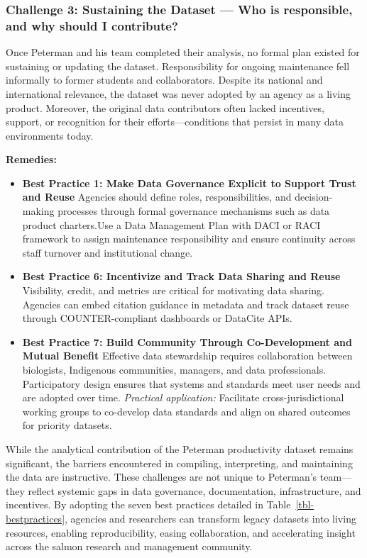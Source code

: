 \documentclass[
  letterpaper,
  DIV=11,
  numbers=noendperiod]{scrartcl}
\begin{document}
\subsubsection{Challenge 3: Sustaining the Dataset --- Who is
responsible, and why should I
contribute?}\label{challenge-3-sustaining-the-dataset-who-is-responsible-and-why-should-i-contribute}

Once Peterman and his team completed their analysis, no formal plan
existed for sustaining or updating the dataset. Responsibility for
ongoing maintenance fell informally to former students and
collaborators. Despite its national and international relevance, the
dataset was never adopted by an agency as a living product. Moreover,
the original data contributors often lacked incentives, support, or
recognition for their efforts---conditions that persist in many data
environments today.

\textbf{Remedies:}

\begin{itemize}
\item
  \textbf{Best Practice 1: Make Data Governance Explicit to Support
  Trust and Reuse} Agencies should define roles, responsibilities, and
  decision-making processes through formal governance mechanisms such as
  data product charters.Use a Data Management Plan with DACI or RACI
  framework to assign maintenance responsibility and ensure continuity
  across staff turnover and institutional change.
\item
  \textbf{Best Practice 6: Incentivize and Track Data Sharing and Reuse}
  Visibility, credit, and metrics are critical for motivating data
  sharing. Agencies can embed citation guidance in metadata and track
  dataset reuse through COUNTER-compliant dashboards or DataCite APIs.
\item
  \textbf{Best Practice 7: Build Community Through Co-Development and
  Mutual Benefit} Effective data stewardship requires collaboration
  between biologists, Indigenous communities, managers, and data
  professionals. Participatory design ensures that systems and standards
  meet user needs and are adopted over time. \emph{Practical
  application:} Facilitate cross-jurisdictional working groups to
  co-develop data standards and align on shared outcomes for priority
  datasets.
\end{itemize}

While the analytical contribution of the Peterman productivity dataset
remains significant, the barriers encountered in compiling,
interpreting, and maintaining the data are instructive. These challenges
are not unique to Peterman's team---they reflect systemic gaps in data
governance, documentation, infrastructure, and incentives. By adopting
the seven best practices detailed in Table~\ref{tbl-bestpractices},
agencies and researchers can transform legacy datasets into living
resources, enabling reproducibility, easing collaboration, and
accelerating insight across the salmon research and management
community.
\end{document}
